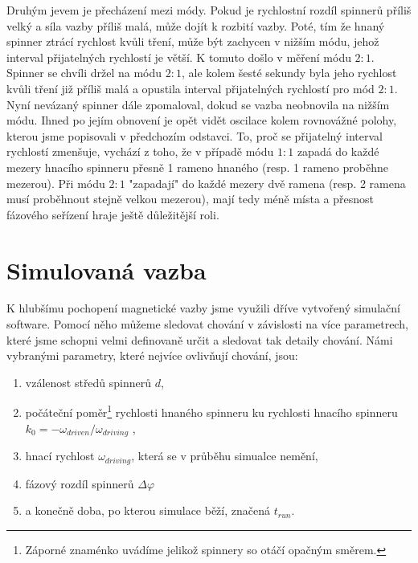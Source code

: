 Druhým jevem je přecházení mezi módy. Pokud je rychlostní rozdíl spinnerů příliš velký a síla vazby příliš malá, může dojít k rozbití vazby. Poté, tím že hnaný spinner ztrácí rychlost kvůli tření, může být zachycen v nižším módu, jehož interval přijatelných rychlostí je větší. K tomuto došlo v měření módu $2:1$. Spinner se chvíli držel na módu $2:1$, ale kolem šesté sekundy byla jeho rychlost kvůli tření již příliš malá a opustila interval přijatelných rychlostí pro mód $2:1$. Nyní nevázaný spinner dále zpomaloval, dokud se vazba neobnovila na nižším módu. Ihned po jejím obnovení je opět vidět oscilace kolem rovnovážné polohy, kterou jsme popisovali v předchozím odstavci. To, proč se přijatelný interval rychlostí zmenšuje, vychází z toho, že v případě módu $1:1$ zapadá do každé mezery hnacího spinneru přesně 1 rameno hnaného (resp. 1 rameno proběhne mezerou). Při módu $2:1$ "zapadají" do každé mezery dvě ramena (resp. 2 ramena musí proběhnout stejně velkou mezerou), mají tedy méně místa a přesnost fázového seřízení hraje ještě důležitější roli.

\clearpage

\section{Simulovaná vazba}

K hlubšímu pochopení magnetické vazby jsme využili dříve vytvořený simulační software. Pomocí něho můžeme sledovat chování v závislosti na více parametrech, které jsme schopni velmi definovaně určit a sledovat tak detaily chování. Námi vybranými parametry, které nejvíce ovlivňují chování, jsou:

\begin{enumerate}[topsep=0pt, partopsep=0pt]
    \setlength{\itemsep}{0pt}%
    \setlength{\parskip}{0pt}%
    \item vzálenost středů spinnerů $d$,
    \item počáteční poměr\footnote{Záporné znaménko uvádíme jelikož spinnery so otáčí opačným směrem.} rychlosti hnaného spinneru ku rychlosti hnacího spinneru $k_0 = -\omega_{driven} / \omega_{driving}$ ,
    \item hnací rychlost $\omega_{driving}$, která se v průběhu simualce nemění,
    \item fázový rozdíl spinnerů $\Delta \varphi$
    \item a konečně doba, po kterou simulace běží, značená $t_{run}$. 
\end{enumerate}

